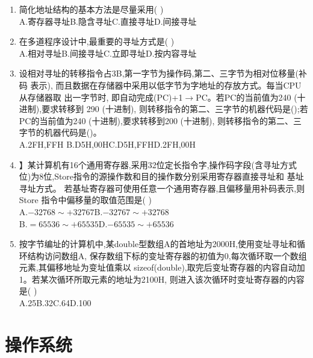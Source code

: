 \documentclass[12pt, a4paper, oneside, UTF8]{ctexbook}
\begin{document}
\begin{enumerate}
    \item 简化地址结构的基本方法是尽量采用(   ) \\
    A.寄存器寻址\qquad B.隐含寻址\qquad C.直接寻址\qquad D.间接寻址 

    \item 在多道程序设计中,最重要的寻址方式是(   ) \\
    A.相对寻址\qquad B.间接寻址\qquad C.立即寻址\qquad D.按内容寻址
    
    \item 设相对寻址的转移指令占3B,第一字节为操作码,第二、三字节为相对位移量(补码 表示),
    而且数据在存储器中采用以低字节为字地址的存放方式。每当CPU从存储器取 出一字节时,
    即自动完成(PC)+1$\rightarrow$PC。若PC的当前值为240 (十进制),要求转移到 290 (十进制),
    则转移指令的第二、三字节的机器代码是();若PC的当前值为240 (十进制),要求转移到200 (十进制),
    则转移指令的第二、三字节的机器代码是()。 \\
    A.2FH,FFH \qquad B.D5H,00H\qquad C.D5H,FFH\qquad D.2FH,00H

    \item 】某计算机有16个通用寄存器,采用32位定长指令字,操作码字段(含寻址方式位)为8位,Store指令的源操作数和目的操作数分别采用寄存器直接寻址和 基址寻址方式。
    若基址寄存器可使用任意一个通用寄存器,且偏移量用补码表示,则Store 指令中偏移量的取值范围是(   ) \\
    A.$-32768\sim +32767$\qquad B.$-32767\sim +32768$ \\
    B.$=65536\sim +65535$\qquad D.$-65535\sim +65536$ 

    \item 按字节编址的计算机中,某double型数组A的首地址为2000H,使用变址寻址和循环结构访问数组A,
    保存数组下标的变址寄存器的初值为0,每次循环取一个数组元素,其偏移地址为变址值乘以
    sizeof(double),取完后变址寄存器的内容自动加1。若某次循环所取元素的地址为2100H,
    则进入该次循环时变址寄存器的内容是(   ) \\
    A.25\qquad B.32\qquad C.64\qquad D.100 

\end{enumerate}

\newpage
\section{操作系统}
\end{document}

